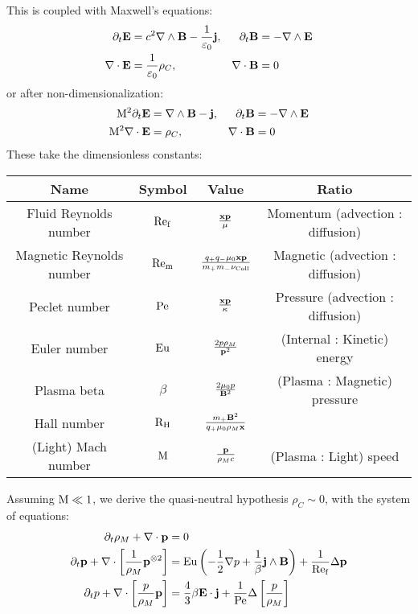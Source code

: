     This is coupled with Maxwell's equations:
    \begin{align*}
        \partial_{t}\mathbf{E}  &=  c^{2}\nabla\wedge\mathbf{B} - \frac{1}{\varepsilon_{0}}\mathbf{j},  &
        \partial_{t}\mathbf{B}  &=  - \nabla\wedge\mathbf{E}  \\
        \nabla\cdot\mathbf{E}  &=  \frac{1}{\varepsilon_{0}}\rho_{C},  &
        \nabla\cdot\mathbf{B}  &=  0
    \end{align*}
    or after non-dimensionalization:
    \begin{align*}
        \mathrm{M}^{2}\partial_{t}\mathbf{E}  &=  \nabla\wedge\mathbf{B} - \mathbf{j},  &
        \partial_{t}\mathbf{B}  &=  - \nabla\wedge\mathbf{E}  \\
        \mathrm{M}^{2}\nabla\cdot\mathbf{E}  &=  \rho_{C},  &
        \nabla\cdot\mathbf{B}  &=  0
    \end{align*}
    These take the dimensionless constants: 
    \begin{center}\begin{tabular}{ c c c c }
        Name  &  Symbol  &  Value  &  Ratio  \\
        \hline\hline
        Fluid Reynolds number  &  $\mathrm{Re}_{\mathrm{f}}$  &  $\frac{\mathbf{x}\mathbf{p}}{\mu}$  &  Momentum (advection : diffusion)  \\
        Magnetic Reynolds number  &  $\mathrm{Re}_{\mathrm{m}}$  &  $\frac{q_{+}q_{-}\mu_{0}\mathbf{x}\mathbf{p}}{m_{+}m_{-}\nu_{\rm Coll}}$  &  Magnetic (advection : diffusion)  \\
        Peclet number  &  $\mathrm{Pe}$  &  $\frac{\mathbf{x}\mathbf{p}}{\kappa}$  &  Pressure (advection : diffusion)  \\
        \hline
        Euler number  &  $\mathrm{Eu}$  &  $\frac{2p\rho_{M}}{\mathbf{p}^{2}}$  &  (Internal : Kinetic) energy  \\
        Plasma beta  &  $\beta$  &  $\frac{2\mu_{0}p}{\mathbf{B}^{2}}$  &  (Plasma : Magnetic) pressure  \\
        Hall number  &  $\mathrm{R}_{\mathrm{H}}$  &  $\frac{m_{+}\mathbf{B}^{2}}{q_{+}\mu_{0}\rho_{M}\mathbf{x}}$  &  \BA{??}  \\
        (Light) Mach number  &  $\mathrm{M}$  &  $\frac{\mathbf{p}}{\rho_{M}c}$  &  (Plasma : Light) speed
    \end{tabular}\end{center}
    Assuming $\mathrm{M}  \ll  1$, we derive the quasi-neutral hypothesis $\rho_{C}  \sim  0$, with the system of equations:
    \begin{align}
        \partial_{t}\rho_{M} + \nabla\cdot\mathbf{p}  &=  0  \label{eqn:mass conservation} 
         \\
        \partial_{t}\mathbf{p} + \nabla\cdot\left[\frac{1}{\rho_{M}}\mathbf{p}^{\otimes 2}\right]  &=  \mathrm{Eu}\left(- \frac{1}{2}\nabla p + \frac{1}{\beta}\mathbf{j}\wedge\mathbf{B}\right) + \frac{1}{\mathrm{Re}_{\mathrm{f}}}\Delta\mathbf{p}  \label{eqn:momentum conservation}  \\
        \partial_{t}p + \nabla\cdot\left[\frac{p}{\rho_{M}}\mathbf{p}\right]  &=  \frac{4}{3}\beta\mathbf{E}\cdot\mathbf{j} + \frac{1}{\mathrm{Pe}}\Delta\left[\frac{p}{\rho_{M}}\right]  \label{eqn:energy conservation}
    \end{align}
